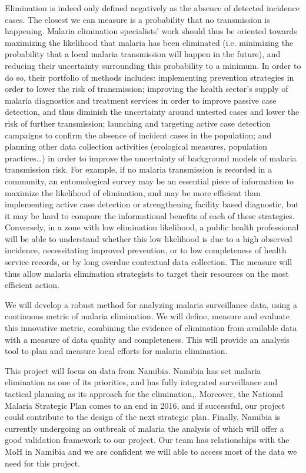 Elimination is indeed only defined negatively as the absence of detected incidence cases. The closest we can measure is a probability that no transmission is happening. Malaria elimination specialists' work should thus be oriented towards maximizing the likelihood that malaria has been eliminated (i.e. minimizing the probability that a local malaria transmission will happen in the future), and reducing their uncertainty surrounding this probability to a minimum.  In order to do so, their portfolio of methods includes: implementing prevention strategies in order to lower the risk of transmission; improving the health sector’s supply of malaria diagnostics and treatment services in order to improve passive case detection, and thus diminish the uncertainty around untested cases and lower the risk of further transmission; launching and targeting active case detection campaigns to confirm the absence of incident cases in the population; and planning other data collection activities (ecological measures, population practices…) in order to improve the uncertainty of background models of malaria transmission risk. For example, if no malaria transmission is recorded in a community, an entomological survey may be an essential piece of information to maximize the likelihood of elimination, and may be more efficient than implementing active case detection or strengthening facility based diagnostic, but it may be hard to compare the informational benefits of each of these strategies. Conversely, in a zone with low elimination likelihood, a public health professional will be able to understand whether this low likelihood is due to a high observed incidence, necessitating improved prevention, or to low completeness of health service records, or by long overdue contextual data collection. The measure will thus allow malaria elimination strategists to target their resources on the most efficient action.

We will develop a robust method for analyzing malaria surveillance data, using a continuous metric of malaria elimination. We will define, measure and evaluate this innovative metric, combining the evidence of elimination from available data with a measure of data quality and completeness. This will provide an analysis tool to plan and measure local efforts for malaria elimination.

This project will focus on data from Namibia. Namibia has set malaria elimination as one of its priorities\cite{NamibiaElimniation}, and has fully integrated surveillance and tactical planning as its approach for the elimination\cite{StrengtheningTactical},\cite{NamStratPlan}. Moreover, the National Malaria Strategic Plan comes to an end in 2016, and if successful, our project could contribute to the design of the next strategic plan. Finally, Namibia is currently undergoing an outbreak of malaria the analysis of which will offer a good validation framework to our project. Our team has relationships with the MoH in Namibia and we are confident we will able to access most of the data we need for this project.

